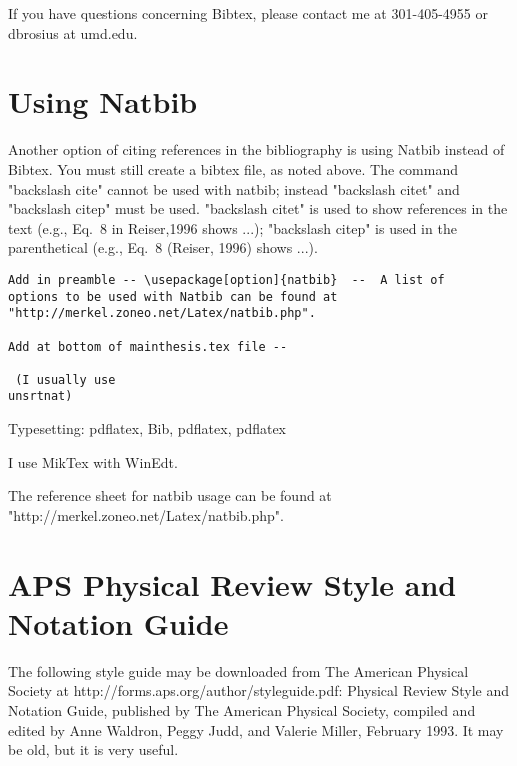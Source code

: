 If you have questions concerning Bibtex, please contact me at 301-405-4955 or dbrosius at umd.edu.

\section{Using Natbib}

Another option of citing references in the bibliography is using
Natbib instead of Bibtex.  You must still create a bibtex file, as
noted above.  The command "backslash cite" cannot be used with
natbib; instead "backslash citet" and "backslash citep" must be
used. "backslash citet" is used to show references in the text
(e.g., Eq.\ 8 in Reiser,1996 shows ...); "backslash citep" is used
in the parenthetical (e.g., Eq.\ 8 (Reiser, 1996) shows ...).

\begin{verbatim}
Add in preamble -- \usepackage[option]{natbib}  --  A list of
options to be used with Natbib can be found at
"http://merkel.zoneo.net/Latex/natbib.php".

Add at bottom of mainthesis.tex file --

 (I usually use
unsrtnat)

\end{verbatim}

Typesetting:   pdflatex, Bib, pdflatex, pdflatex

I use MikTex with WinEdt.

The reference sheet for natbib usage can be found at \newline "http://merkel.zoneo.net/Latex/natbib.php".

\section{APS Physical Review Style and Notation Guide}

The following style guide may be downloaded from The American Physical Society at http://forms.aps.org/author/styleguide.pdf:  Physical Review Style and Notation Guide, published by The American Physical Society, compiled and edited by Anne Waldron, Peggy Judd, and Valerie Miller, February 1993.  It may be old, but it is very useful.
